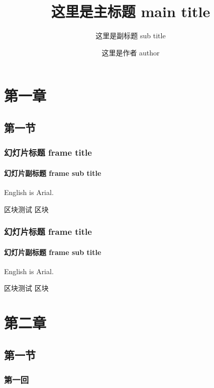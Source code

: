 \documentclass[12pt]{beamer}
\title{这里是主标题 main title}
\subtitle{这里是副标题 sub title}
\author{这里是作者 author}
\institute{这里是学院 institute}
\begin{document}
\maketitle


\section{第一章}

\subsection{第一节}


\begin{frame}[t]
    \frametitle{幻灯片标题 frame title}
    \framesubtitle{幻灯片副标题 frame sub title}

    English is Arial.

    \begin{block}{区块测试}
        区块
    \end{block}

\end{frame}

\begin{frame}[t]
    \frametitle{幻灯片标题 frame title}
    \framesubtitle{幻灯片副标题 frame sub title}

    English is Arial.

    \insertsection

    \begin{block}{区块测试}
        区块
    \end{block}

\end{frame}

\section{第二章}
\subsection{第一节}
\subsubsection{第一回}
\end{document}
